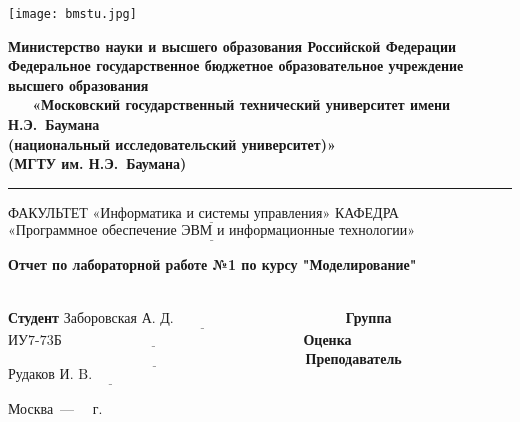 \documentclass[12pt]{report}
\begin{document}
\def\chaptername{}
\thispagestyle{empty}
\begin{titlepage}
	\noindent \begin{minipage}{0.15\textwidth}
	\texttt{[image: bmstu.jpg]}
	\end{minipage}
	\noindent\begin{minipage}{0.9\textwidth}\centering
		\textbf{Министерство науки и высшего образования Российской Федерации}\\
		\textbf{Федеральное государственное бюджетное образовательное учреждение высшего образования}\\
		\textbf{~~~«Московский государственный технический университет имени Н.Э.~Баумана}\\
		\textbf{(национальный исследовательский университет)»}\\
		\textbf{(МГТУ им. Н.Э.~Баумана)}
	\end{minipage}
	
	\noindent\rule{18cm}{3pt}
	\newline\newline
	\noindent ФАКУЛЬТЕТ $\underline{\text{«Информатика и системы управления»}}$ \newline\newline
	\noindent КАФЕДРА $\underline{\text{«Программное обеспечение ЭВМ и информационные технологии»}}$\newline\newline\newline\newline\newline
	
	
	\begin{center}
        \Large\textbf{Отчет по лабораторной работе №1 по курсу "Моделирование"}
    \end{center}

    \\
    \noindent\textbf{Студент} $\underline{\text{Заборовская А. Д.~~~~~~~~~~~~~~~~~~~~~~~~~~~~~~~~~~~~}}$\newline\newline
    \noindent\textbf{Группа} $\underline{\text{ИУ7-73Б~~~~~~~~~~~~~~~~~~~~~~~~~~~~~~~~~~~~~~~~~~~~~~~~~~~}}$\newline\newline
    \noindent\textbf{Оценка} $\underline{\text{~~~~~~~~~~~~~~~~~~~~~~~~~~~~~~~~~~~~~~~~~~~~~~~~~~~~~~~~~~~~~~~}}$\newline\newline
    \noindent\textbf{Преподаватель} $\underline{\text{Рудаков И. B.~~~~~~~~~~~~~~~~~~~~~~~~~~}}$\newline

	
	\begin{center}
		\vfill
		Москва~---~\the\year
		~г.
	\end{center}
\end{titlepage}
\end{document}
